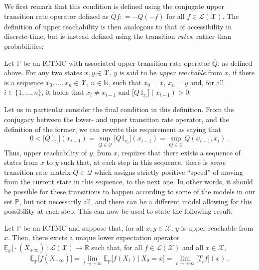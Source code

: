 \documentclass[graybox]{svmult}
\newcommand{\nats}{\mathbb{N}}
\newcommand{\reals}{\mathbb{R}}
\newcommand{\states}{\mathcal{X}}
\newcommand{\gambles}{\mathcal{L}}
\newcommand{\gamblesX}{\gambles(\states)}
\newcommand{\coloneqq}{:\!=}
\begin{document}
We first remark that this condition is defined using the conjugate upper transition rate operator defined as $\overline{Q}f\coloneqq -\underline{Q}(-f)$ for all $f\in\gamblesX$. The definition of upper reachability is then analogous to that of accessibility in discrete-time, but is instead defined using the transition \emph{rates}, rather than probabilities:
\begin{definition}
Let $\mathbb{P}$ be an ICTMC with associated upper transition rate operator $\overline{Q}$, as defined above. For any two states $x,y\in\states$, $y$ is said to be \emph{upper reachable} from $x$, if there is a sequence $x_0,\ldots,x_n\in\states$, $n\in\nats$, such that $x_0=x$, $x_n=y$ and, for all $i\in\{1,\ldots,n\}$, it holds that $x_{i}\neq x_{i-1}$ and $\bigl[\overline{Q}\,\mathbb{I}_{x_i}\bigr](x_{i-1})>0$.
\end{definition}
Let us in particular consider the final condition in this definition. From the conjugacy between the lower- and upper transition rate operator, and the definition of the former, we can rewrite this requirement as saying that
\begin{equation*}
0 < \bigl[\overline{Q}\,\mathbb{I}_{x_i}\bigr](x_{i-1}) = \sup_{Q\in\mathcal{Q}} \bigl[Q\,\mathbb{I}_{x_i}\bigr](x_{i-1}) = \sup_{Q\in\mathcal{Q}} Q(x_{i-1},x_i)\,.
\end{equation*}
Thus, upper reachability of $y$, from $x$, requires that there exists a sequence of states from $x$ to $y$ such that, at each step in this sequence, there is \emph{some} transition rate matrix $Q\in\mathcal{Q}$ which assigns strictly positive ``speed'' of moving from the current state in this sequence, to the next one. In other words, it should be possible for these transitions to happen according to some of the models in our set $\mathbb{P}$, but not necessarily all, and there can be a different model allowing for this possibility at each step. This can now be used to state the following result:

\begin{theorem}\label{theo:ictmc_ergodic_simple}
Let $\mathbb{P}$ be an ICTMC and suppose that, for all $x,y\in\states$, $y$ is upper reachable from $x$. Then, there exists a unique lower expectation operator $\underline{\mathbb{E}}_\mathbb{P}\bigl[\cdot(X_{+\infty})\bigr]:\gamblesX\to\reals$ such that, for all $f\in\gamblesX$ and all $x\in\states$,
\begin{equation*}
\underline{\mathbb{E}}_\mathbb{P}\bigl[f(X_{+\infty})\bigr] = \lim_{t\to+\infty} \underline{\mathbb{E}}_\mathbb{P}\bigl[f(X_{t})\,\big\vert\,X_0=x\bigr] = \lim_{t\to+\infty}\bigl[\underline{T}_tf\bigr](x)\,.
\end{equation*}
\end{theorem}
\end{document}
